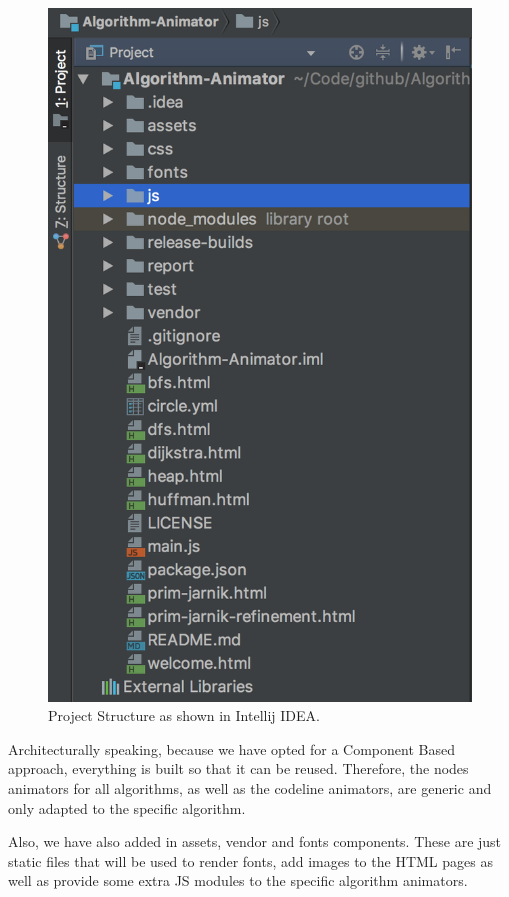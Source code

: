 \documentclass{l4proj}
\begin{document}
\begin{figure}[!ht]
    \centering
    \includegraphics[scale=0.4]{project-structure}
    \caption{Project Structure as shown in Intellij IDEA.}
    \label{fig:project-structure}
\end{figure}

Architecturally speaking, because we have opted for a Component Based approach, everything is built so that it can be
reused. Therefore, the nodes animators for all algorithms, as well as the codeline animators, are generic and only
adapted to the specific algorithm. 

Also, we have also added in assets, vendor and fonts components. These are just static files that will be used to render fonts,
add images to the HTML pages as well as provide some extra JS modules to the specific algorithm animators. 
\end{document}
